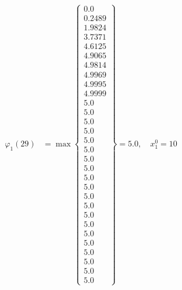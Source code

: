 \documentclass{article}
\begin{document}
\begin{align*}
\varphi_{1}(29) &= \max \left\{ \begin{array}{c}
0.0 \\
 0.2489 \\
 1.9824 \\
 3.7371 \\
 4.6125 \\
 4.9065 \\
 4.9814 \\
 4.9969 \\
 4.9995 \\
 4.9999 \\
 5.0 \\
 5.0 \\
 5.0 \\
 5.0 \\
 5.0 \\
 5.0 \\
 5.0 \\
 5.0 \\
 5.0 \\
 5.0 \\
 5.0 \\
 5.0 \\
 5.0 \\
 5.0 \\
 5.0 \\
 5.0 \\
 5.0 \\
 5.0 \\
 5.0 \\
 5.0
\end{array} \right\}=5.0, \quad x_{1}^0=10\\
  

\end{align*}
\end{document}
